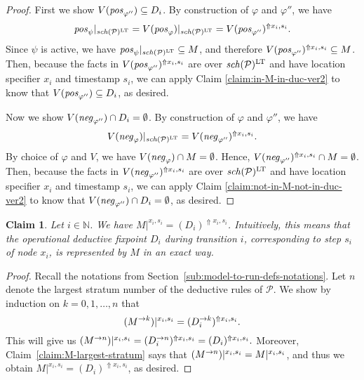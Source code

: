 \documentclass{tlp}
\newtheorem{claim}[theorem]{Claim}
\newcommand{\Nat}{\mathbb{N}}  \newcommand{\len}[1]{|#1|} \newcommand{\rom}[1]{\text{\emph{(#1)}}} \newcommand{\romI}{\rom i}
\newcommand{\ded}{\mathcal{P}}
\newcommand{\proj}[2]{#1|_{#2}}
\newcommand{\rl}{\varphi}
\newcommand{\bpos}[1]{\fname{pos}_{#1}}
\newcommand{\bneg}[1]{\fname{neg}_{#1}}
\newcommand{\schof}[1]{\fname{sch}(#1)}
\newcommand{\grl}{\psi}
\newcommand{\sh}[1]{(#1)}
\newcommand{\toloct}[1]{#1^{\mathrm{LT}}}
\newcommand{\addlt}[3]{#1^{\Uparrow#2,#3}}
\newcommand{\projlt}[3]{#1|^{#2,#3}}
\newcommand{\shprojlt}[3]{\projlt{\sh{#1}}{#2}{#3}}
\newcommand{\shaddlt}[3]{\addlt{\sh{#1}}{#2}{#3}}
\begin{document}
\begin{appendix}
\begin{proof}
First we show $V(\bpos{\rl''})\subseteq D_{i}$. By construction of
$\rl$ and $\rl''$, we have 
\[
\proj{\bpos{\grl}}{\toloct{\schof{\ded}}}=\proj{V(\bpos{\rl})}{\toloct{\schof{\ded}}}=\addlt{V(\bpos{\rl''})}{x_{i}}{s_{i}}.
\]
Since $\grl$ is active, we have $\proj{\bpos{\grl}}{\toloct{\schof{\ded}}}\subseteq M$,
and therefore $\addlt{V(\bpos{\rl''})}{x_{i}}{s_{i}}\subseteq M$.
 Then, because the facts in $\addlt{V(\bpos{\rl''})}{x_{i}}{s_{i}}$
are over $\toloct{\schof{\ded}}$ and have location specifier $x_{i}$
and timestamp $s_{i}$, we can apply Claim \ref{claim:in-M-in-duc-ver2}
to know that $V(\bpos{\rl''})\subseteq D_{i}$, as desired.

Now we show $V(\bneg{\rl''})\cap D_{i}=\emptyset$. By construction
of $\rl$ and $\rl''$, we have 
\[
\proj{V(\bneg{\rl})}{\toloct{\schof{\ded}}}=\addlt{V(\bneg{\rl''})}{x_{i}}{s_{i}}.
\]
By choice of $\rl$ and $V$, we have $V(\bneg{\rl})\cap M=\emptyset$.
Hence, $\addlt{V(\bneg{\rl''})}{x_{i}}{s_{i}}\cap M=\emptyset$. Then,
because the facts in $\addlt{V(\bneg{\rl''})}{x_{i}}{s_{i}}$ are
over $\toloct{\schof{\ded}}$ and have location specifier $x_{i}$
and timestamp $s_{i}$, we can apply Claim \ref{claim:not-in-M-not-in-duc-ver2}
to know that $V(\bneg{\rl''})\cap D_{i}=\emptyset$, as desired.\end{proof}



\tline







\begin{claim}\label{claim:M-and-duc}Let $i\in\Nat$. We have $\projlt M{x_{i}}{s_{i}}=\addlt{(D_{i})}{x_{i}}{s_{i}}$.
Intuitively, this means that the operational deductive fixpoint $D_{i}$
during transition $i$, corresponding to step $s_{i}$ of node $x_{i}$,
is represented by $M$ in an exact way.\end{claim}

\begin{proof}

Recall the notations from Section~\ref{sub:model-to-run-defs-notations}.
Let $n$ denote the largest stratum number of the deductive rules
of $\ded$. We show by induction on $k=0,1,\ldots,n$ that 
\[
\shprojlt{\strat Mk}{x_{i}}{s_{i}}=\shaddlt{\strat{D_{i}}k}{x_{i}}{s_{i}}.
\]
This will give us $\shprojlt{\strat Mn}{x_{i}}{s_{i}}=\shaddlt{\strat{D_{i}}n}{x_{i}}{s_{i}}=\addlt{(D_{i})}{x_{i}}{s_{i}}.$
Moreover, Claim~\ref{claim:M-largest-stratum} says that $\shprojlt{\strat Mn}{x_{i}}{s_{i}}=\projlt M{x_{i}}{s_{i}}$,
and thus we obtain $\projlt M{x_{i}}{s_{i}}=\addlt{(D_{i})}{x_{i}}{s_{i}}$,
as desired.



\end{proof}
\end{appendix}
\end{document}
